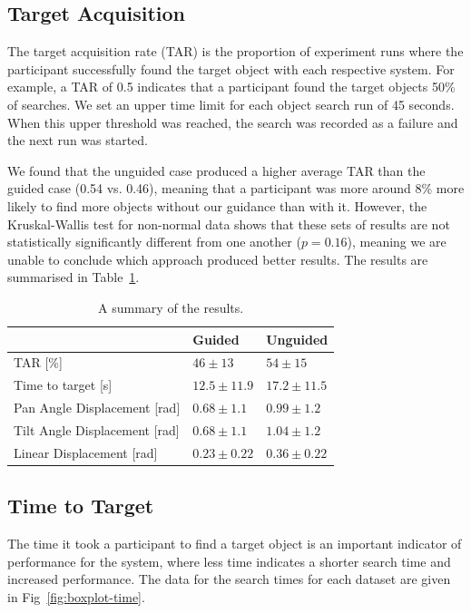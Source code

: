 \documentclass[runningheads]{llncs}
\newcommand\todo[1]{\textcolor{red}{#1}}
\begin{document}
\subsection{Target Acquisition}

The target acquisition rate (TAR) is the proportion of experiment runs where the participant successfully found the target object with each respective system. 
For example, a TAR of 0.5 indicates that a participant found the target objects 50\% of searches. 
We set an upper time limit for each object search run of 45 seconds.
When this upper threshold was reached, the search was recorded as a failure and the next run was started. 

We found that the unguided case produced a higher average TAR than the guided case (0.54 vs. 0.46), meaning that a participant was more around 8\% more likely to find more objects without our guidance than with it.
However, the Kruskal-Wallis test for non-normal data shows that these sets of results are not statistically significantly different from one another ($p = 0.16$), meaning we are unable to conclude which approach produced better results. 
The results are summarised in Table~\ref{tab:results}. 

\begin{table}
  \centering
  \caption{A summary of the results. }\label{tab:results}
  \begin{tabular}{p{5cm}p{2cm}p{2cm}}
    \toprule
    & \textbf{Guided} & \textbf{Unguided} \\\midrule
    TAR [\%]           & $46\pm13$ & $54\pm15$   \\\midrule
    Time to target [s] & $12.5\pm11.9$ & $17.2\pm11.5$ \\\midrule
    Pan Angle Displacement [rad] & $0.68\pm1.1$ & $0.99\pm1.2$ \\\midrule
    Tilt Angle Displacement [rad] & $0.68\pm1.1$ & $1.04\pm1.2$ \\\midrule
    Linear Displacement [rad] & $0.23\pm0.22$ & $0.36\pm0.22$ \\\midrule
    \bottomrule
  \end{tabular}
\end{table}

\subsection{Time to Target}

The time it took a participant to find a target object is an important indicator of performance for the system, where less time indicates a shorter search time and increased performance.
The data for the search times for each dataset are given in Fig~\ref{fig:boxplot-time}.%
\end{document}
